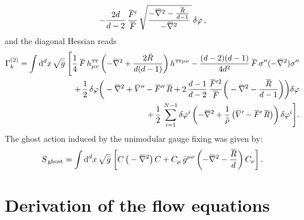 \documentclass[11pt]{book}
\newcommand{\overbar}[1]{\mkern 1.5mu\overline{\mkern-1.5mu#1\mkern-1.5mu}\mkern 1.5mu}
\newcommand\TTspace{ -1pt }
\newcommand\TT{ \scriptscriptstyle{\mathrm{T\hspace{\TTspace}T}} }
\newcommand\hTTmunu{ h^{\scriptscriptstyle{\mathrm{T\hspace{\TTspace}T}}}_{\mu\nu} }
\newcommand{\bnabla}{\overbar \nabla}
\newcommand{\bR}{\overbar R}
\newcommand{\bV}{\overbar V}
\newcommand{\bF}{\overbar F}
\newcommand{\deltap}{\delta \varphi}
\numberwithin{equation}{chapter}
\begin{document}
\begin{appendices}
\begin{align}
  -\frac{2d}{d-2} \, \frac{\bF'}{\bF} \, \sqrt{\frac{-\bnabla^2-\frac{\bR}{d-1}}{-\bnabla^2} \, } \, \deltap \,,
\end{align}
and the diagonal Hessian reads
\begin{align}
  \Gamma_k^{(2)} = \int \mathrm{d}^d x \, \sqrt{\bar{g}} \;
  \Bigg[
    \frac{1}{4} \, \bF \, \hTTmunu
    \left(
      -\bnabla^2 + \frac{2 \bar{R}}{d(d-1)}
    \right)
    h^{{\TT}\mu\nu}
    - \frac{(d-2)(d-1)}{4d^2} \, \bF \, \sigma^{\prime\prime} (-\bnabla^2) \sigma^{\prime\prime}
    \nonumber\\
    +\, \frac{1}{2} \, \deltap
    \bigg(
      - \bnabla^2 + \bV'' - \bF'' \, \bR
      + 2 \, \frac{d-1}{d-2} \, \frac{\bF'{}^2}{\bF}
      \bigg(
        -\bnabla^2 - \frac{\bR}{d-1}
      \bigg)
    \bigg) \deltap \nonumber \\
    +\,\frac{1}{2} \, \sum_{i=1}^{N-1} \deltap^i
    \left(
      -\bnabla^2 + \frac{1}{\overbar \rho} \, \big( \bV' - \bF' \, \bR \big)
    \right)
    \deltap^i
  \Bigg] .
  \label{hessfinal}
\end{align}
The ghost action induced by the unimodular gauge fixing was given by:
\begin{align}
  S_{\,\mathrm{ghost}} = \int \mathrm d^dx \, \sqrt{\bar g} \;
  \bigg[
    C \, \big( -\bnabla^2 \big) \, C
    + C_\mu \, \bar g^{\mu\nu}
    \left( -\bnabla^2-\frac{\bR}{d} \right) C_\nu
  \bigg]
  \,.
\end{align}

\section{Derivation of the flow equations}


\end{appendices}
\end{document}
